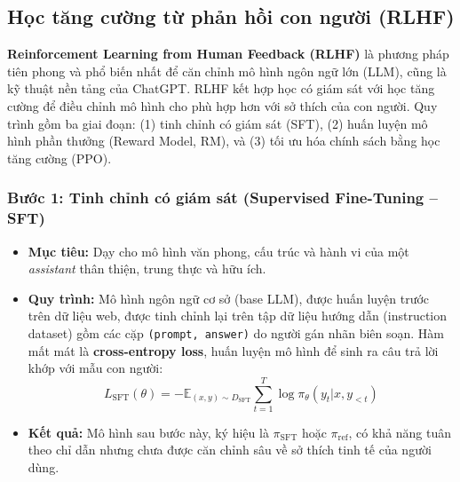 \subsection{Học tăng cường từ phản hồi con người (RLHF)}
\label{ssec:rlhf}

\textbf{Reinforcement Learning from Human Feedback (RLHF)} \cite{christiano2017deep, stiennon2020learning} là phương pháp tiên phong và phổ biến nhất để căn chỉnh mô hình ngôn ngữ lớn (LLM), cũng là kỹ thuật nền tảng của ChatGPT.
RLHF kết hợp học có giám sát với học tăng cường để điều chỉnh mô hình cho phù hợp hơn với sở thích của con người.
Quy trình gồm ba giai đoạn: (1) tinh chỉnh có giám sát (SFT), (2) huấn luyện mô hình phần thưởng (Reward Model, RM), và (3) tối ưu hóa chính sách bằng học tăng cường (PPO).

\begin{center}
    \label{fig:rlhf_pipeline}
\end{center}

\subsubsection*{Bước 1: Tinh chỉnh có giám sát (Supervised Fine-Tuning -- SFT)}
\begin{itemize}
    \item \textbf{Mục tiêu:} Dạy cho mô hình văn phong, cấu trúc và hành vi của một \textit{assistant} thân thiện, trung thực và hữu ích.
    \item \textbf{Quy trình:} Mô hình ngôn ngữ cơ sở (base LLM), được huấn luyện trước trên dữ liệu web, được tinh chỉnh lại trên tập dữ liệu hướng dẫn (instruction dataset) gồm các cặp \texttt{(prompt, answer)} do người gán nhãn biên soạn.
    Hàm mất mát là \textbf{cross-entropy loss}, huấn luyện mô hình để sinh ra câu trả lời khớp với mẫu con người:
    \[
        L_{\text{SFT}}(\theta) = - \mathbb{E}_{(x,y)\sim D_{\text{SFT}}} \sum_{t=1}^{T} \log \pi_{\theta}(y_t | x, y_{<t})
    \]
    \item \textbf{Kết quả:} Mô hình sau bước này, ký hiệu là $\pi_{\text{SFT}}$ hoặc $\pi_{\text{ref}}$, có khả năng tuân theo chỉ dẫn nhưng chưa được căn chỉnh sâu về sở thích tinh tế của người dùng.
\end{itemize}

